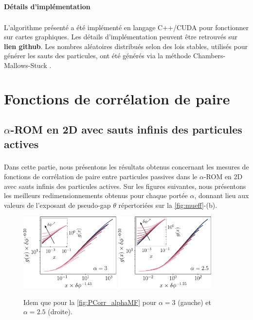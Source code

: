 \paragraph{Détails d'implémentation}

\subparagraph{}L'algorithme présenté a été implémenté en langage C++/CUDA pour fonctionner sur cartes graphiques. Les détails d'implémentation peuvent être retrouvés sur \textbf{lien github}. Les nombres aléatoires distribués selon des lois stables, utilisés pour générer les sauts des particules, ont été générés via la méthode Chambers-Mallows-Stuck \cite{chambers_method_1976, weron_chambers_mallows_stuck_1996}.

\section{Fonctions de corrélation de paire}

\stoptocwriting

\label{sec:PCorr}

\subsection{$\alpha$-ROM en 2D avec sauts infinis des particules actives}

\subparagraph{}Dans cette partie, nous présentons les résultats obtenus concernant les mesures de fonctions de corrélation de paire entre particules passives dans le $\alpha$-ROM en 2D avec sauts infinis des particules actives. Sur les figures suivantes, nous présentons les meilleurs redimensionnements obtenus pour chaque portée $\alpha$, donnant lieu aux valeurs de l'exposant de pseudo-gap $\theta$ répertoriées sur la \autoref{fig:mueff}-(b).

\begin{figure}[h]
\centering
\includegraphics[width=0.45\textwidth]{Chapitre3/Figures/Interpretation/PCorrMF/PCorr_rescaled_MF_alpha3.pdf}
\includegraphics[width=0.45\textwidth]{Chapitre3/Figures/Interpretation/PCorrMF/PCorr_rescaled_MF_alpha25.pdf}
\caption{Idem que pour la \autoref{fig:PCorr_alphaMF} pour $\alpha = 3$ (gauche) et $\alpha = 2.5$ (droite).}
\label{fig:PCorrAnnexe1}
\end{figure}

